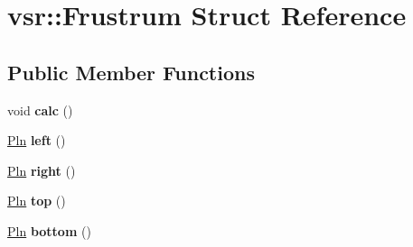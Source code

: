 \hypertarget{structvsr_1_1_frustrum}{\section{vsr\-:\-:Frustrum Struct Reference}
\label{structvsr_1_1_frustrum}
}
\subsection*{Public Member Functions}
\begin{DoxyCompactItemize}
\item 
\hypertarget{structvsr_1_1_frustrum_a8fec2dd441bdbb71ab6b77dbafa3f8de}{void {\bfseries calc} ()}\label{structvsr_1_1_frustrum_a8fec2dd441bdbb71ab6b77dbafa3f8de}

\item 
\hypertarget{structvsr_1_1_frustrum_adf8379237128601d02ecf75f011d324c}{\hyperlink{namespacevsr_a545350582a051c1eddecf80e3f337501}{Pln} {\bfseries left} ()}\label{structvsr_1_1_frustrum_adf8379237128601d02ecf75f011d324c}

\item 
\hypertarget{structvsr_1_1_frustrum_a0c79cf808b0d1759f87e8fbfd7277560}{\hyperlink{namespacevsr_a545350582a051c1eddecf80e3f337501}{Pln} {\bfseries right} ()}\label{structvsr_1_1_frustrum_a0c79cf808b0d1759f87e8fbfd7277560}

\item 
\hypertarget{structvsr_1_1_frustrum_a0939df2e421d9eb462b75bd204ef4d18}{\hyperlink{namespacevsr_a545350582a051c1eddecf80e3f337501}{Pln} {\bfseries top} ()}\label{structvsr_1_1_frustrum_a0939df2e421d9eb462b75bd204ef4d18}

\item 
\hypertarget{structvsr_1_1_frustrum_a7abde255cbe8b2cbf2ce7009134a52ae}{\hyperlink{namespacevsr_a545350582a051c1eddecf80e3f337501}{Pln} {\bfseries bottom} ()}\label{structvsr_1_1_frustrum_a7abde255cbe8b2cbf2ce7009134a52ae}

\end{DoxyCompactItemize}
